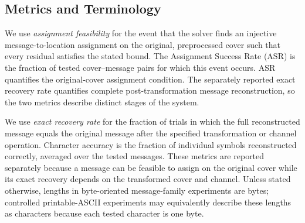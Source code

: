 \documentclass[preprint,12pt]{elsarticle}
\theoremstyle{plain}
\begin{document}
\subsection{Metrics and Terminology}
\label{sec:metrics}

We use \emph{assignment feasibility} for the event that the solver finds an
injective message-to-location assignment on the original, preprocessed cover
such that every residual satisfies the stated bound. The Assignment Success
Rate (ASR) is the fraction of tested cover--message pairs for which this event
occurs. ASR quantifies the original-cover assignment condition. The separately
reported exact recovery rate quantifies complete post-transformation message
reconstruction, so the two metrics describe distinct stages of the system.

We use \emph{exact recovery rate} for the fraction of trials in which the full
reconstructed message equals the original message after the specified
transformation or channel operation. Character accuracy is the fraction of
individual symbols reconstructed correctly, averaged over the tested
messages. These metrics are reported separately because a message can be
feasible to assign on the original cover while its exact recovery depends on
the transformed cover and channel. Unless stated otherwise, lengths in byte-oriented message-family
experiments are bytes; controlled printable-ASCII experiments may equivalently
describe these lengths as characters because each tested character is one
byte.
\end{document}
